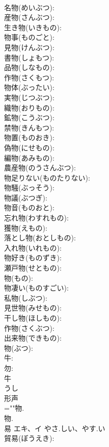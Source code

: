 \documentclass[8pt]{extreport}
\begin{document}
\begin{CJK}{UTF8}{min}
\\	名物(めいぶつ): 
\\	産物(さんぶつ): 
\\	生き物(いきもの): 
\\	物事(ものごと): 
\\	見物(けんぶつ): 
\\	書物(しょもつ): 
\\	品物(しなもの): 
\\	作物(さくもつ): 
\\	物体(ぶったい): 
\\	実物(じつぶつ): 
\\	織物(おりもの): 
\\	鉱物(こうぶつ): 
\\	禁物(きんもつ): 
\\	物置(ものおき): 
\\	偽物(にせもの): 
\\	編物(あみもの): 
\\	農産物(のうさんぶつ): 
\\	物足りない(ものたりない): 
\\	物騒(ぶっそう): 
\\	物議(ぶつぎ): 
\\	物音(ものおと): 
\\	忘れ物(わすれもの): 
\\	獲物(えもの): 
\\	落とし物(おとしもの): 
\\	入れ物(いれもの): 
\\	物好き(ものずき): 
\\	瀬戸物(せともの): 
\\	物(もの): 
\\	物凄い(ものすごい): 
\\	私物(しぶつ): 
\\	見世物(みせもの): 
\\	干し物(ほしもの): 
\\	作物(さくぶつ): 
\\	出来物(できもの): 
\\	物(ぶつ): 
\\	牛: 
\\	勿: 
\\	牛	
\\	うし	
\\	形声 
\\	=""物.
\\	物.
\\	易	エキ、イ	やさ.しい、やす.い		
\\	貿易(ぼうえき): 

\end{CJK}
\end{document}
